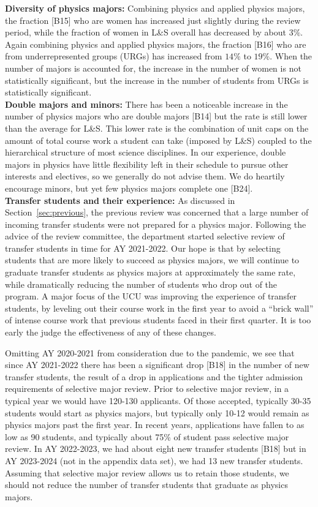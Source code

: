 \documentclass[12pt]{article}
\begin{document}
\noindent
{\bf Diversity of physics majors:} Combining physics and applied
physics majors, the fraction [B15] who are women has increased just
slightly during the review period, while the fraction of women in L\&S
overall has decreased by about $3\%$.  Again combining physics and
applied physics majors, the fraction [B16] who are from
underrepresented groups (URGs) has increased from $14\%$ to $19\%$.
When the number of majors is accounted for, the increase in the number
of women is not statistically significant, but the increase in the
number of students from URGs is statistically significant.\\[3pt]

\noindent
{\bf Double majors and minors:} There has been a noticeable increase
in the number of physics majors who are double majors [B14] but the
rate is still lower than the average for L\&S.  This lower rate is the
combination of unit caps on the amount of total course work a student
can take (imposed by L\&S) coupled to the hierarchical structure of
most science disciplines.  In our experience, double majors in physics
have little flexibility left in their schedule to pursue other
interests and electives, so we generally do not advise them.  We do
heartily encourage minors, but yet few physics majors complete one
[B24].\\[3pt]

\noindent
{\bf Transfer students and their experience:} As discussed in
Section~\ref{sec:previous}, the previous review was concerned that a
large number of incoming transfer students were not prepared for a
physics major.  Following the advice of the review committee, the
department started selective review of transfer students in time for
AY 2021-2022.  Our hope is that by selecting students that are more
likely to succeed as physics majors, we will continue to graduate
transfer students as physics majors at approximately the same rate,
while dramatically reducing the number of students who drop out of the
program.  A major focus of the UCU was improving the experience of
transfer students, by leveling out their course work in the first year
to avoid a ``brick wall'' of intense course work that previous
students faced in their first quarter.  It is too early the judge the
effectiveness of any of these changes.

Omitting AY 2020-2021 from consideration due to the pandemic, we see
that since AY 2021-2022 there has been a significant drop [B18] in the
number of new transfer students, the result of a drop in applications
and the tighter admission requirements of selective major review.
Prior to selective major review, in a typical year we would have
120-130 applicants.  Of those accepted, typically 30-35 students would
start as physics majors, but typically only 10-12 would remain as
physics majors past the first year.  In recent years, applications
have fallen to as low as 90 students, and typically about 75\% of
student pass selective major review.  In AY 2022-2023, we had about
eight new transfer students [B18] but in AY 2023-2024 (not in the
appendix data set), we had 13 new transfer students.  Assuming that
selective major review allows us to retain those students, we should
not reduce the number of transfer students that graduate as physics
majors.
\end{document}
